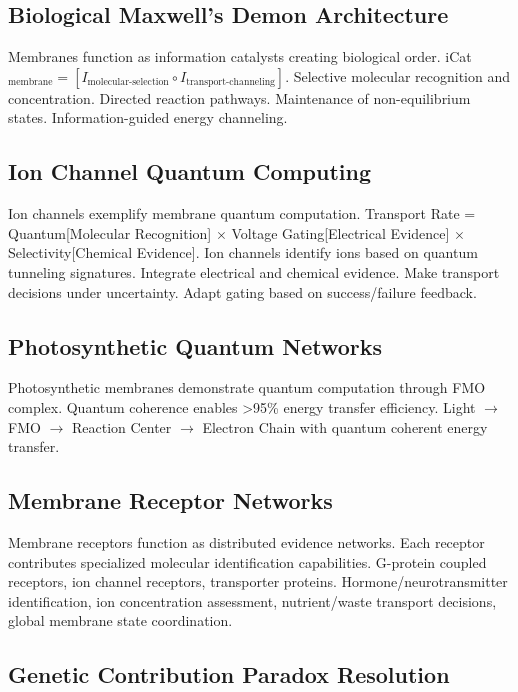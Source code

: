 \documentclass[12pt,a4paper]{article}
\begin{document}
\subsection{Biological Maxwell's Demon Architecture}

Membranes function as information catalysts creating biological order. iCat$_{\text{membrane}} = [I_{\text{molecular-selection}} \circ I_{\text{transport-channeling}}]$. Selective molecular recognition and concentration. Directed reaction pathways. Maintenance of non-equilibrium states. Information-guided energy channeling.

\subsection{Ion Channel Quantum Computing}

Ion channels exemplify membrane quantum computation. Transport Rate = Quantum[Molecular Recognition] $\times$ Voltage Gating[Electrical Evidence] $\times$ Selectivity[Chemical Evidence]. Ion channels identify ions based on quantum tunneling signatures. Integrate electrical and chemical evidence. Make transport decisions under uncertainty. Adapt gating based on success/failure feedback.

\subsection{Photosynthetic Quantum Networks}

Photosynthetic membranes demonstrate quantum computation through FMO complex. Quantum coherence enables >95\% energy transfer efficiency. Light $\to$ FMO $\to$ Reaction Center $\to$ Electron Chain with quantum coherent energy transfer.

\subsection{Membrane Receptor Networks}

Membrane receptors function as distributed evidence networks. Each receptor contributes specialized molecular identification capabilities. G-protein coupled receptors, ion channel receptors, transporter proteins. Hormone/neurotransmitter identification, ion concentration assessment, nutrient/waste transport decisions, global membrane state coordination.

\subsection{Genetic Contribution Paradox Resolution}
\end{document}

